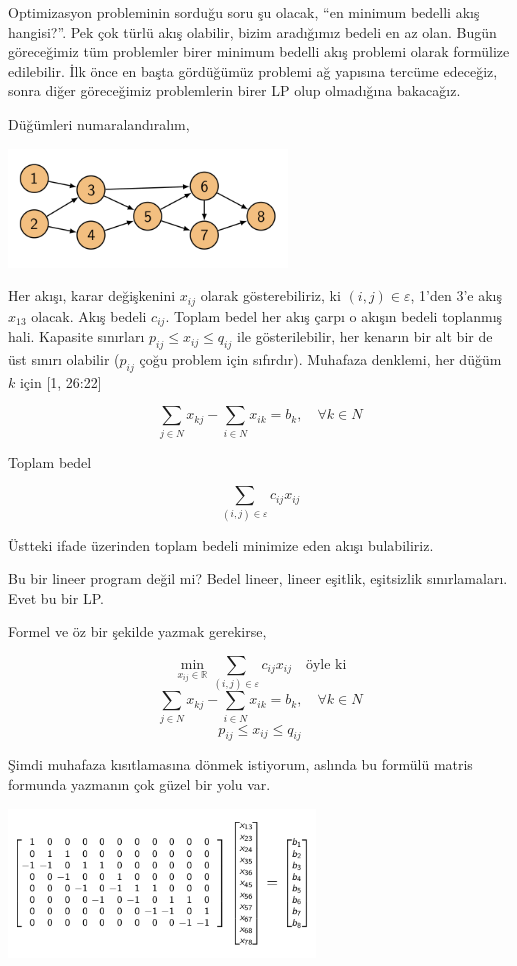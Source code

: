 \documentclass[12pt,fleqn]{article}\usepackage{../../common}
\begin{document}
Optimizasyon probleminin sorduğu soru şu olacak, ``en minimum bedelli akış
hangisi?''. Pek çok türlü akış olabilir, bizim aradığımız bedeli en az
olan. Bugün göreceğimiz tüm problemler birer minimum bedelli akış problemi
olarak formülize edilebilir. İlk önce en başta gördüğümüz problemi ağ
yapısına tercüme edeceğiz, sonra diğer göreceğimiz problemlerin birer LP
olup olmadığına bakacağız. 

Düğümleri numaralandıralım,

\includegraphics[width=20em]{func_90_nflow_03.png}

Her akışı, karar değişkenini $x_{ij}$ olarak gösterebiliriz, ki
$(i,j) \in \varepsilon$, 1'den 3'e akış $x_{13}$ olacak. Akış bedeli
$c_{ij}$. Toplam bedel her akış çarpı o akışın bedeli toplanmış
hali. Kapasite sınırları $p_{ij} \le x_{ij} \le q_{ij}$ ile gösterilebilir,
her kenarın bir alt bir de üst sınırı olabilir ($p_{ij}$ çoğu problem için
sıfırdır). Muhafaza denklemi, her düğüm $k$ için [1, 26:22]

$$
\sum_{j \in N} x_{kj} - \sum_{i \in N} x_{ik} = b_k, \quad \forall k \in N
$$

Toplam bedel

$$
\sum_{(i,j) \in \varepsilon } c_{ij} x_{ij}
$$

Üstteki ifade üzerinden toplam bedeli minimize eden akışı bulabiliriz. 

Bu bir lineer program değil mi? Bedel lineer, lineer eşitlik, eşitsizlik
sınırlamaları. Evet bu bir LP. 

Formel ve öz bir şekilde yazmak gerekirse, 

$$
\min_{x_{ij} \in \mathbb{R}} \sum_{(i,j) \in \varepsilon } c_{ij} x_{ij}
\quad \textrm{öyle ki}
$$
$$
\sum_{j \in N} x_{kj} - \sum_{i \in N} x_{ik} = b_k, \quad \forall k \in N
$$
$$
p_{ij} \le x_{ij} \le q_{ij}
$$

Şimdi muhafaza kısıtlamasına dönmek istiyorum, aslında bu formülü matris
formunda yazmanın çok güzel bir yolu var. 

\includegraphics[width=22em]{func_90_nflow_04.png}
\end{document}
